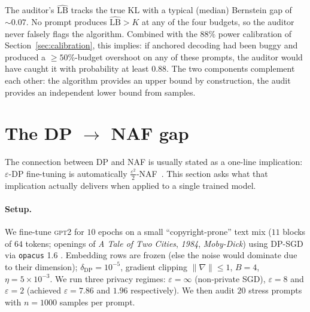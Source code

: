 \documentclass{article}
\begin{document}
The auditor's $\widehat{\mathrm{LB}}$ tracks the true KL with a typical (median) Bernstein gap of $\sim 0.07$.  No prompt produces $\widehat{\mathrm{LB}}>K$ at any of the four budgets, so the auditor never falsely flags the algorithm.  Combined with the $88\%$ power calibration of Section~\ref{sec:calibration}, this implies: if anchored decoding had been buggy and produced a $\ge 50\%$-budget overshoot on any of these prompts, the auditor would have caught it with probability at least $0.88$.  The two components complement each other: the algorithm provides an upper bound by construction, the audit provides an independent lower bound from samples.


\section{The DP \texorpdfstring{$\to$}{=>} NAF gap}
\label{sec:dpnaf}

The connection between DP and NAF is usually stated as a one-line implication: $\varepsilon$-DP fine-tuning is automatically $\tfrac{\varepsilon^2}{2}$-NAF~\cite{vyas2023naf,bunsteinke2016cdp}.  This section asks what that implication actually delivers when applied to a single trained model.

\paragraph{Setup.}
We fine-tune \textsc{gpt2} for $10$ epochs on a small ``copyright-prone'' text mix ($11$ blocks of $64$ tokens; openings of \emph{A Tale of Two Cities}, \emph{1984}, \emph{Moby-Dick}) using DP-SGD via \texttt{opacus} 1.6 \cite{yousefpour2021opacus}.  Embedding rows are frozen (else the noise would dominate due to their dimension); $\delta_{\mathrm{DP}}=10^{-5}$, gradient clipping $\|\nabla\|\le 1$, $B=4$, $\eta=5\!\times\!10^{-3}$.  We run three privacy regimes: $\varepsilon=\infty$ (non-private SGD), $\varepsilon=8$ and $\varepsilon=2$ (achieved $\varepsilon=7.86$ and $1.96$ respectively).  We then audit $20$ stress prompts with $n=1000$ samples per prompt.
\end{document}
